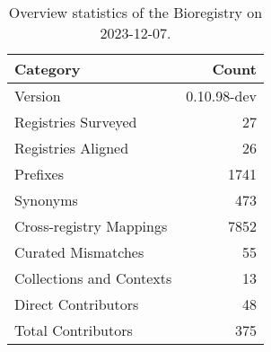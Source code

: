\begin{table}
\caption{Overview statistics of the Bioregistry on 2023-12-07.}
\label{tab:bioregistry-summary}
\begin{tabular}{lr}
\toprule
Category & Count \\
\midrule
Version & 0.10.98-dev \\
Registries Surveyed & 27 \\
Registries Aligned & 26 \\
Prefixes & 1741 \\
Synonyms & 473 \\
Cross-registry Mappings & 7852 \\
Curated Mismatches & 55 \\
Collections and Contexts & 13 \\
Direct Contributors & 48 \\
Total Contributors & 375 \\
\bottomrule
\end{tabular}
\end{table}
